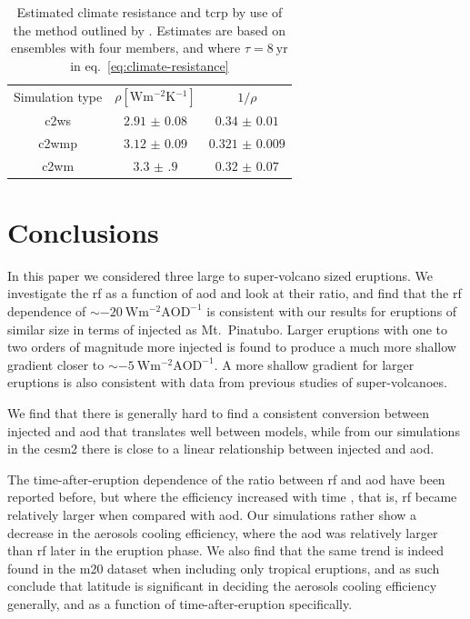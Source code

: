 \documentclass{ametsocV6.1}
\newcommand{\iso}[1][i]{{#1}njected \ce{SO2}}
\begin{document}
\begin{table}
  \centering

  \caption{Estimated climate resistance and \gls{tcrp} by use of the method outlined by
    \citet{merlis2014}. Estimates are based on ensembles with four members, and where \(\tau
    =\SI{8}{\mathrm{yr}}\) in eq.~\ref{eq:climate-resistance}}\label{tab:trcp}%
  \begin{tabular}{ccc}
    Simulation type & \(\rho [\si{\watt\metre^{-2}\kelvin^{-1}}]\) & \(1/\rho\)         \\
    \gls{c2ws}      & \(\num{2.91(8)}\)                            & \(\num{0.34(1)}\)  \\
    \gls{c2wmp}     & \(\num{3.12(9)}\)                            & \(\num{0.321(9)}\) \\
    \gls{c2wm}      & \(\num{3.3(9)}\)                             & \(\num{0.32(7)}\)  \\
  \end{tabular}
\end{table}

\section{Conclusions}\label{sec:conclusions}

In this paper we considered three large to super-volcano sized eruptions. We investigate
the \gls{rf} as a function of \gls{aod} and look at their ratio, and find that the
\gls{rf} dependence of \(\sim\SI{-20}{\watt\metre^{-2}\mathrm{AOD}^{-1}}\) is consistent
with our results for eruptions of similar size in terms of \iso{} as Mt.\ Pinatubo.
Larger eruptions with one to two orders of magnitude more \iso{} is found to produce a
much more shallow gradient closer to \(\sim
\SI{-5}{\watt\metre^{-2}\mathrm{AOD}^{-1}}\). A more shallow gradient for larger
eruptions is also consistent with data from previous studies of super-volcanoes.

We find that there is generally hard to find a consistent conversion between \iso{} and
\gls{aod} that translates well between models, while from our simulations in the
\gls{cesm2} there is close to a linear relationship between \iso{} and \gls{aod}.

The time-after-eruption dependence of the ratio between \gls{rf} and \gls{aod} have been
reported before, but where the efficiency increased with time \citep{marshall2020}, that
is, \gls{rf} became relatively larger when compared with \gls{aod}. Our simulations
rather show a decrease in the aerosols cooling efficiency, where the \gls{aod} was
relatively larger than \gls{rf} later in the eruption phase. We also find that the same
trend is indeed found in the \gls{m20} dataset when including only tropical eruptions,
and as such conclude that latitude is significant in deciding the aerosols cooling
efficiency generally, and as a function of time-after-eruption specifically.
\end{document}
